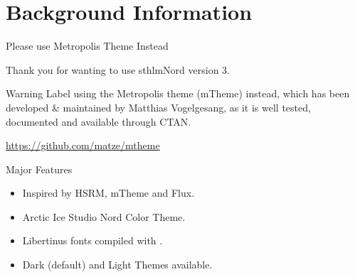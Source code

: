 \documentclass[aspectratio=169, sectionpages]{beamer}
\begin{document}
\section{Background Information}


\begin{frame}{Please use Metropolis Theme Instead}

Thank you for wanting to use sthlmNord version 3.

\vspace{1em}
\begin{alertblock}{Warning Label}
 using the Metropolis 
theme (mTheme) instead, which has been developed \& maintained by Matthias 
Vogelgesang, as it is well tested, documented and available through CTAN. 
\end{alertblock}
\begin{center}
	\url{https://github.com/matze/mtheme}
\end{center}
\end{frame}


\begin{frame}[c,fragile]{Major Features}

	\begin{itemize}
		\item Inspired by HSRM, mTheme and Flux.
		\item Arctic Ice Studio Nord Color Theme.
		\item Libertinus fonts compiled with \XeLaTeX. 
		\item Dark (default) and Light Themes available.
	\end{itemize}
	
	\end{frame}
	
\end{document}
